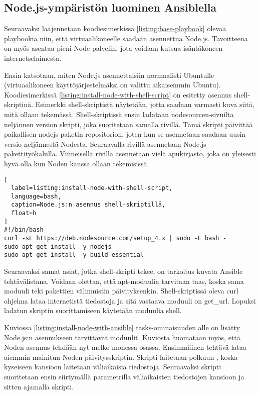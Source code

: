 \subsection{Node.js-ympäristön luominen Ansiblella}

Seuraavaksi laajennetaan koodiesimerkissä \ref{listing:base-playbook} olevaa playbookia niin, että virtuaalikoneelle saadaan asennettua Node.js. Tavoitteena on myös asentaa pieni Node-palvelin, jota voidaan kutsua isäntäkoneen internetselaimesta.

Ensin katsotaan, miten Node.js asennettaisiin normaalisti Ubuntulle (virtuaalikoneen käyttöjärjestelmäksi on valittu aikaisemmin Ubuntu). Koodiesimerkissä \ref{listing:install-node-with-shell-script} on esitetty asennus shell-skriptinä. Esimerkki shell-skriptistä näytetään, jotta saadaan varmasti kuva siitä, mitä ollaan tekemässä. Shell-skriptissä ensin ladataan nodesourcen-sivuilta neljännen version skripti, joka suoritetaan samalla rivillä. Tämä skripti päivittää paikallisen nodejs paketin repositorion, joten kun se asennetaan saadaan uusin versio neljännestä Nodesta. Seuraavalla rivillä asennetaan Node.js pakettityökalulla. Viimeisellä rivillä asennetaan vielä apukirjasto, joka on yleisesti hyvä olla kun Noden kanssa ollaan tekemisissä.

\begin{lstlisting}[
  label=listing:install-node-with-shell-script,
  language=bash,
  caption=Node.js:n asennus shell-skriptillä,
  float=h
]
#!/bin/bash
curl -sL https://deb.nodesource.com/setup_4.x | sudo -E bash -
sudo apt-get install -y nodejs
sudo apt-get install -y build-essential
\end{lstlisting}

Seuraavaksi samat asiat, jotka shell-skripti tekee, on tarkoitus kuvata Ansible tehtävälistana. Voidaan olettaa, että apt-moduulia tarvitaan taas, koska sama moduuli teki pakettien välimuistin päivityksenkin. Shell-skriptissä oleva curl ohjelma lataa internetistä tiedostoja ja sitä vastaava moduuli on get\_url. Lopuksi ladatun skriptin suorittamiseen käytetään moduulia shell.

Kuviossa \ref{listing:install-node-with-ansible} tasks-ominaisuuden alle on lisätty Node.js:n asennukseen tarvittavat moduulit. Kuviosta huomataan myös, että Noden asennus tehdään nyt melko monessa osassa. Ensimmäinen tehtävä lataa aiemmin mainitun Noden päivitysskriptin. Skripti laitetaan polkuun , koska kyseiseen kansioon laitetaan väliaikaisia tiedostoja. Seuraavaksi skripti suoritetaan ensin siirtymällä parametrilla  väliaikaisten tiedostojen kansioon ja sitten ajamalla skripti.

